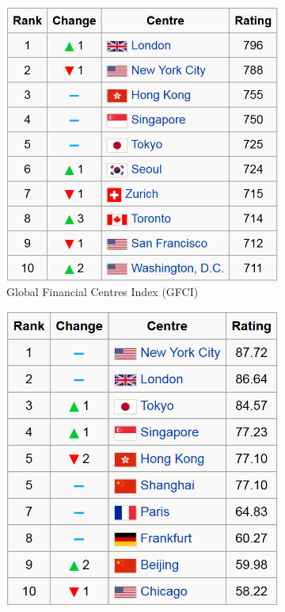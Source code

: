 \documentclass[international_finance_p1.tex]{subfiles}
\begin{document}
\begin{frame}[shrink=20]
\begin{figure}	
	\centering
	\begin{subfigure}[t]{5.1cm}
		\centering
		\includegraphics[scale=0.4]{img/financial_centers_ranking1.png}
	\caption{Global Financial Centres Index (GFCI)}\label{fig:a_fin_centers_index}	
	\end{subfigure}
	\quad
	\begin{subfigure}[t]{5.1cm}
		\centering
		\includegraphics[scale=0.4]{img/financial_centers_ranking2.png}

\end{subfigure}
\end{figure}
\end{frame}
\end{document}
